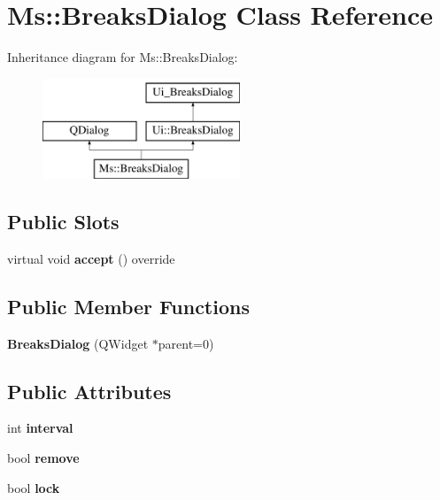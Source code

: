 \hypertarget{class_ms_1_1_breaks_dialog}{}\section{Ms\+:\+:Breaks\+Dialog Class Reference}
\label{class_ms_1_1_breaks_dialog}
Inheritance diagram for Ms\+:\+:Breaks\+Dialog\+:\begin{figure}[H]
\begin{center}
\leavevmode
\includegraphics[height=3.000000cm]{class_ms_1_1_breaks_dialog}
\end{center}
\end{figure}
\subsection*{Public Slots}
\begin{DoxyCompactItemize}
\item 
\mbox{\label{class_ms_1_1_breaks_dialog_ac9acdd6d84ed4ce3aec18d2906c718bd}} 
virtual void {\bfseries accept} () override
\end{DoxyCompactItemize}
\subsection*{Public Member Functions}
\begin{DoxyCompactItemize}
\item 
\mbox{\label{class_ms_1_1_breaks_dialog_a07580298485405656e1d76a1b809b5bd}} 
{\bfseries Breaks\+Dialog} (Q\+Widget $\ast$parent=0)
\end{DoxyCompactItemize}
\subsection*{Public Attributes}
\begin{DoxyCompactItemize}
\item 
\mbox{\label{class_ms_1_1_breaks_dialog_a36bae7ca96ca9b9be3ed587de8361c46}} 
int {\bfseries interval}
\item 
\mbox{\label{class_ms_1_1_breaks_dialog_aec0e0e19b127ebd30940b9b9b1910988}} 
bool {\bfseries remove}
\item 
\mbox{\label{class_ms_1_1_breaks_dialog_ae34b6cb1df731e1925a5452cfe9b8ab2}} 
bool {\bfseries lock}
\end{DoxyCompactItemize}


